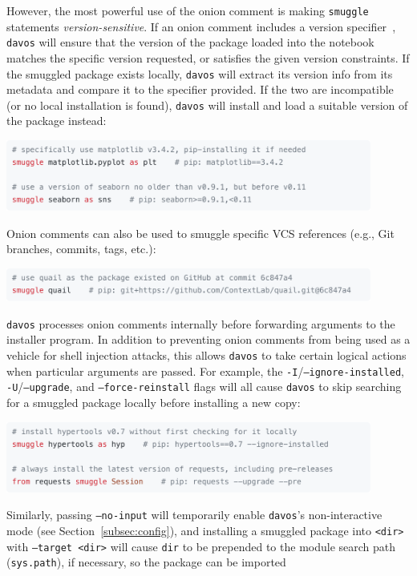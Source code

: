 \documentclass[preprint,12pt,a4paper]{elsarticle}
\begin{document}
However, the most powerful use of the onion comment is making \texttt{smuggle} statements \textit{version-sensitive}. If an onion comment includes a version specifier~\cite{CoghStuf13}, \texttt{davos} will ensure that the version of the package loaded into the notebook matches the specific version requested, or satisfies the given version constraints. If the smuggled package exists locally, \texttt{davos} will extract its version info from its metadata and compare it to the specifier provided. If the two are incompatible (or no local installation is found), \texttt{davos} will install and load a suitable version of the package instead:
\begin{center}
\includegraphics[width=0.9\textwidth]{figs/snippet3}
\end{center}
Onion comments can also be used to smuggle specific VCS references (e.g., Git~\cite{TorvHama05}  branches, commits, tags, etc.):
\begin{center}
\includegraphics[width=0.9\textwidth]{figs/snippet4}
\end{center}
\texttt{davos} processes onion comments internally before forwarding arguments to the installer program. In addition to preventing onion comments from being used as a vehicle for shell injection attacks, this allows \texttt{davos} to take certain logical actions when particular arguments are passed. For example, the \texttt{-I}/\newline\texttt{--ignore-installed}, \texttt{-U}/\texttt{--upgrade}, and \texttt{--force-reinstall} flags will all cause \texttt{davos} to skip searching for a smuggled package locally before installing a new copy:
\begin{center}
\includegraphics[width=0.9\textwidth]{figs/snippet5}
\end{center}
Similarly, passing \texttt{--no-input} will temporarily enable \texttt{davos}'s non-interactive mode (see Section~\ref{subsec:config}), and installing a smuggled package into \texttt{<dir>} with \texttt{--target <dir>} will cause \texttt{dir} to be prepended to the module search path (\texttt{sys.path}), if necessary, so the package can be imported
\end{document}

